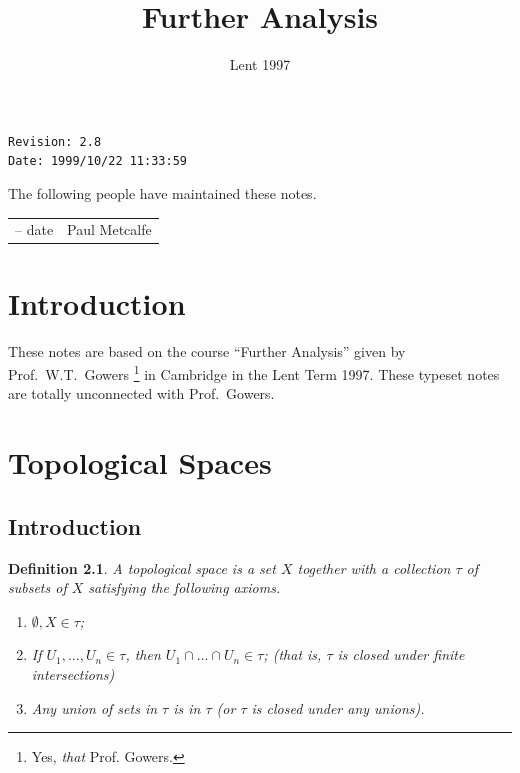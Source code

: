 \documentclass{notes}
\theoremstyle{plain}
\newtheorem{definition}[proposition]{Definition}
\begin{document}
\frontmatter
\title{Further Analysis}

\date{Lent 1997}
\maketitle

\thispagestyle{empty}

\noindent\verb$Revision: 2.8 $\hfill\\
\noindent\verb$Date: 1999/10/22 11:33:59 $\hfill\

\vspace{1.5in}

The following people have maintained these notes.

\begin{center}
\begin{tabular}{ r  l}
-- date & Paul Metcalfe
\end{tabular}
\end{center}

\tableofcontents

\chapter{Introduction}

These notes are based on the course ``Further Analysis''
given by Prof.~W.T.~Gowers%
\footnote{Yes, \emph{that} Prof. Gowers.}
in Cambridge in the Lent Term 1997.  These
typeset notes are totally unconnected with Prof.~Gowers.

\alsoavailable
\archimcopyright

\mainmatter

\chapter{Topological Spaces}

\section{Introduction}

\begin{definition}
  A topological space is a set $X$ together
  with a collection $\tau$ of subsets of $X$ satisfying the following
  axioms.

\begin{enumerate}
\item $\emptyset, X \in \tau$;
\item If $U_1, \dots, U_n \in \tau$, then $U_1 \cap \dots \cap U_n \in
  \tau$; (that is, $\tau$ is closed under finite intersections)
\item Any union of sets in $\tau$ is in $\tau$ (or $\tau$ is closed
  under any unions).
\end{enumerate}
\end{definition}
\end{document}
